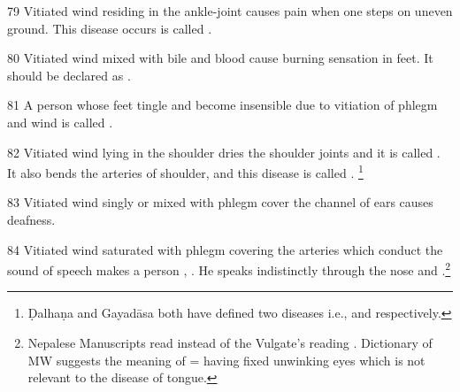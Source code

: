 \begin{translation}
\item[79] Vitiated wind residing in the ankle-joint causes pain when one steps on uneven ground. This disease occurs is called .

\item[80] Vitiated wind mixed with bile and blood cause burning sensation in feet. It should be declared as .

\item[81] A person whose feet tingle and become insensible due to vitiation of phlegm and wind is called .

\item[82] Vitiated wind lying in the shoulder dries the shoulder joints and it is called . It also bends the arteries of shoulder, and this disease is called . \footnote{Ḍalhaṇa and Gayadāsa both have defined two diseases i.e.,  and  respectively.}

\item[83] Vitiated wind singly or mixed with phlegm cover the channel of ears causes deafness.

\item[84] Vitiated wind saturated with phlegm covering the arteries which conduct the sound of speech makes a person , . He speaks indistinctly through the nose and .\footnote{Nepalese Manuscripts read  instead of the Vulgate’s reading . Dictionary of MW suggests the meaning of  = having fixed unwinking eyes which is not relevant to the disease of tongue.}



















 




\end{translation}